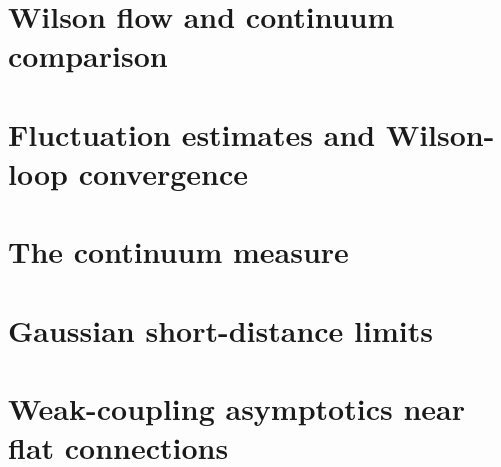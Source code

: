 \documentclass[12pt,oneside,openany]{book}
\begin{document}
\part{Wilson flow and continuum comparison}\label{part:flow}



\part{Fluctuation estimates and Wilson-loop convergence}\label{part:stochastic}




\part{The continuum measure}\label{part:continuum}



\part{Gaussian short-distance limits}\label{part:shortdistance}



\part{Weak-coupling asymptotics near flat connections}\label{part:weak}





\backmatter
\setlength{\bibsep}{3pt plus 1pt minus 1pt}


\end{document}
